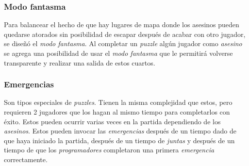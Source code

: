 \subsubsection{Modo fantasma}
Para balancear el hecho de que hay lugares de mapa donde los asesinos pueden quedarse atorados sin posibilidad de escapar después de acabar con otro jugador, se diseñó el \textit{modo fantasma}. Al completar un \textit{puzzle} algún jugador como \textit{asesino} se agrega una posibilidad de usar el \textit{modo fantasma} que le permitirá volverse transparente y realizar una salida de estos cuartos.

\subsubsection{Emergencias}
Son tipos especiales de \textit{puzzles}. Tienen la misma complejidad que estos, pero requieren 2 jugadores que los hagan al mismo tiempo para completarlos con éxito. Estos pueden ocurrir varias veces en la partida dependiendo de los \textit{asesinos}. Estos pueden invocar las \textit{emergencias} después de un tiempo dado de que haya iniciado la partida, después de un tiempo de \textit{juntas} y después de un tiempo de que los \textit{programadores} completaron una primera \textit{emergencia} correctamente.

